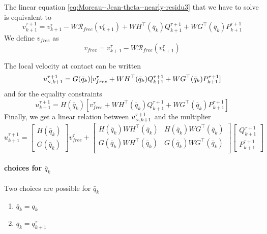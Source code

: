 The linear equation \ref{eq:Moreau--Jean-theta--nearly-residu3} that we have to solve is equivalent to
\begin{equation}
  \label{eq:107}
  \boxed{v^{\tau+1}_{k+1} = v^{\tau}_{k+1} - W  \mathcal R_{free}(v^\tau_{k+1}) + W   H^\top(\bar q_k) Q^{\tau+1}_{k+1} + W G^\top(\bar q_k) P^{\tau+1}_{k+1}}
\end{equation}
We define  $v_{free}$ as
\begin{equation}
  \label{eq:108}
  v_{free}  = v^{\tau}_{k+1} - W  \mathcal R_{free}(v^\tau_{k+1})
\end{equation}

The local velocity at contact can be written
\begin{equation}
  \label{eq:109}
  u^{\tau+1}_{{\hbox{\tiny{N}}},k+1} = G(\bar q_k) [  v_{free}^{\tau} + W   H^\top(\bar q_k) Q^{\tau+1}_{k+1} + W G^\top(\bar q_k) P^{\tau+1}_{k+1}]
\end{equation}
and for the equality constraints
\begin{equation}
  \label{eq:110}
  u^{\tau+1}_{k+1} = H(\bar q_k) [  v_{free}^{\tau} + W   H^\top(\bar q_k) Q^{\tau+1}_{k+1} + W G^\top(\bar q_k) P^{\tau+1}_{k+1}]
\end{equation}
Finally, we get a linear relation between $u^{\tau+1}_{{\hbox{\tiny{N}}},k+1}$ and the multiplier
\begin{equation}
  \label{eq:111}
 \boxed{ u^{\tau+1}_{k+1} =
  \begin{bmatrix}
    H(\bar q_k) \\
    G(\bar q_k)
  \end{bmatrix} v_{free}^{\tau}
  +
  \begin{bmatrix}
    H(\bar q_k)W   H^\top(\bar q_k) & H(\bar q_k)W   G^\top(\bar q_k) \\
    G(\bar q_k)W   H^\top(\bar q_k) & G(\bar q_k)W   G^\top(\bar q_k) \\
  \end{bmatrix}
  \begin{bmatrix}
    Q^{\tau+1}_{k+1} \\
    P^{\tau+1}_{k+1}
  \end{bmatrix}}
\end{equation}






\paragraph{choices for $\bar q_k$} Two choices are possible for $\bar q_k$
\begin{enumerate}
\item $\bar q_k = q_k$
\item $\bar q_k = q^{\tau}_{k+1}$
\end{enumerate}

